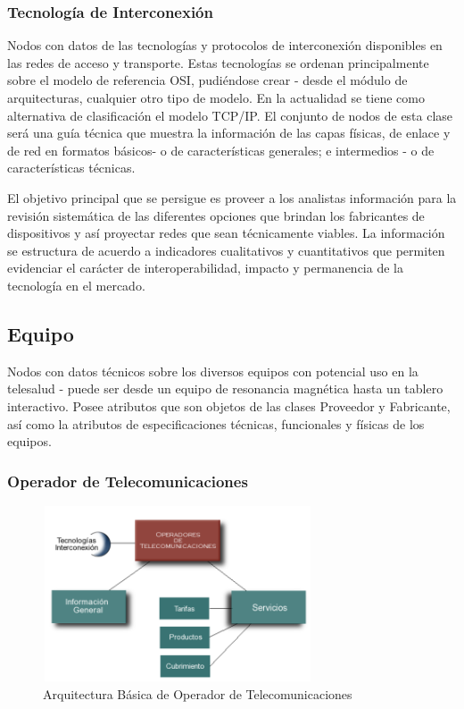 \subsubsection{Tecnología de Interconexión} 
Nodos con datos de las tecnologías y protocolos de interconexión disponibles en las redes de acceso y transporte. Estas tecnologías se ordenan principalmente sobre el modelo de referencia OSI, pudiéndose crear  - desde el módulo de arquitecturas, cualquier otro tipo de modelo. En la actualidad se tiene como alternativa de clasificación el modelo TCP/IP. El conjunto de nodos de esta clase será una guía técnica que muestra la información de las capas físicas, de enlace y de red en formatos básicos- o de características generales; e intermedios - o de características técnicas.

El objetivo principal que se persigue es proveer a los analistas información para la revisión sistemática de las diferentes opciones que brindan los fabricantes de dispositivos y así proyectar redes que sean técnicamente viables. La información se estructura de acuerdo a indicadores cualitativos y cuantitativos que permiten evidenciar el carácter de interoperabilidad, impacto y permanencia de la tecnología en el mercado. 

\subsection{Equipo}
Nodos con datos técnicos sobre los diversos equipos con potencial uso en la telesalud - puede ser desde un equipo de resonancia magnética hasta un tablero interactivo. Posee atributos que son objetos de las clases Proveedor y Fabricante, así como la atributos de especificaciones técnicas, funcionales y físicas de los equipos.

\subsubsection{Operador de Telecomunicaciones}

\begin{figure}
 \centering
 \includegraphics[width=80mm, height=52mm]{operadores.png}
 \caption{Arquitectura Básica de Operador de Telecomunicaciones}
 \label{operadores}
\end{figure}

